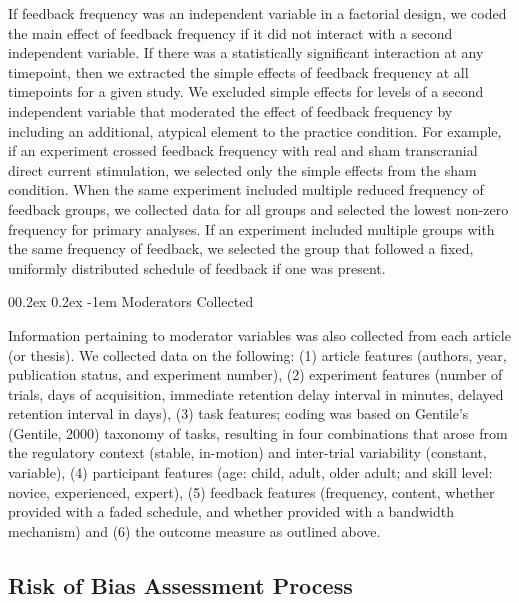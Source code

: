 \documentclass[
  english,
  man,mask,floatsintext]{apa7}
\makeatletter
\let\oldparagraph\paragraph
\renewcommand{\paragraph}[1]{\oldparagraph{#1}\mbox{}}
\renewcommand{\paragraph}{\@startsection{paragraph}{4}{\parindent}%
  {0\baselineskip \@plus 0.2ex \@minus 0.2ex}%
  {-1em}%
  {\normalfont\normalsize\bfseries\itshape\typesectitle}}
\makeatother
\begin{document}
If feedback frequency was an independent variable in a factorial design, we coded the main effect of feedback frequency if it did not interact with a second independent variable. If there was a statistically significant interaction at any timepoint, then we extracted the simple effects of feedback frequency at all timepoints for a given study. We excluded simple effects for levels of a second independent variable that moderated the effect of feedback frequency by including an additional, atypical element to the practice condition. For example, if an experiment crossed feedback frequency with real and sham transcranial direct current stimulation, we selected only the simple effects from the sham condition. When the same experiment included multiple reduced frequency of feedback groups, we collected data for all groups and selected the lowest non-zero frequency for primary analyses. If an experiment included multiple groups with the same frequency of feedback, we selected the group that followed a fixed, uniformly distributed schedule of feedback if one was present.

\hypertarget{moderators-collected}{%
\paragraph{Moderators Collected}\label{moderators-collected}}

Information pertaining to moderator variables was also collected from each article (or thesis). We collected data on the following: (1) article features (authors, year, publication status, and experiment number), (2) experiment features (number of trials, days of acquisition, immediate retention delay interval in minutes, delayed retention interval in days), (3) task features; coding was based on Gentile's (Gentile, 2000) taxonomy of tasks, resulting in four combinations that arose from the regulatory context (stable, in-motion) and inter-trial variability (constant, variable), (4) participant features (age: child, adult, older adult; and skill level: novice, experienced, expert), (5) feedback features (frequency, content, whether provided with a faded schedule, and whether provided with a bandwidth mechanism) and (6) the outcome measure as outlined above.

\hypertarget{risk-of-bias-assessment-process}{%
\subsection{Risk of Bias Assessment Process}\label{risk-of-bias-assessment-process}}
\end{document}
